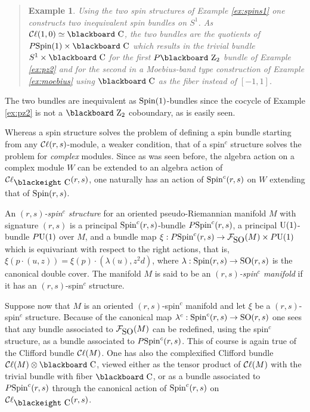 \documentclass[12pt,titlepage]{article}
\def\bbf#1{\hbox{\blackboard #1}}
\def\bbfeight#1{\hbox{\blackeight #1}}
\def\lC{\bbf C}
\def\lCe{\bbfeight C}
\def\lZ{\bbf Z}
\def\cC{{\cal C}}
\def\cF{{\cal F}}
\def\Cl{{\cC\ell}}
\def\SO{\hbox{SO}}
\def\Spin{\hbox{Spin}}
\def\U{\hbox{U}}
\newtheorem{eg}{Example}
\newenvironment{example}{\begin{quote}\begin{eg}}{\end{eg}\end{quote}}
\begin{document}
\begin{example}Using the two spin structures of Example \ref{ex:spins1}
one constructs two inequivalent spin bundles on \(S^1\). As
\(\Cl(1,0)\simeq \lC\), the two bundles are the quotients of
\(P\Spin(1)\times \lC\) which results in the trivial bundle \(S^1\times
\lC\) for the first \(P\lZ_2\) bundle of Example \ref{ex:pz2} and 
for the second in a
Moebius-band type construction of Example \ref{ex:moebius} using \(\lC\)
as the fiber instead of \([-1,1]\). 
\end{example}%
The two bundles are inequivalent as \(\Spin(1)\)-bundles 
since the cocycle 
of Example \ref{ex:pz2} is not a \(\lZ_2\) coboundary, as is easily seen.


Whereas a spin structure solves the problem of defining a spin bundle
starting from any \(\Cl(r,s)\)-module, a weaker condition, that of a
spin\({}^c\) structure solves the problem for {\em complex\/} modules. 
Since as was seen before, 
the algebra action on a complex module \(W\) can
be extended to an algebra action of \(\Cl_{\lCe}(r,s)\), one naturally
has an
action of \(\Spin^c(r,s)\) on \(W\) extending that of \(\Spin(r,s)\).


An {\em \((r,s)\)-spin\({}^c\) structure\/} 
%
for an oriented
pseudo-Riemannian manifold \(M\) with signature \((r,s)\) is a
principal \(\Spin^c(r,s)\)-bundle \(P\Spin^c(r,s)\),  a
principal \(\U(1)\)-bundle \(P\U(1)\) over \(M\), and a bundle
map \(\xi:P\Spin^c(r,s)\to \cF_{\SO}(M)\times P\U(1)\)
which is equivariant with respect to
the right actions, that is,
\(\xi(p\cdot(u, z))=\xi(p)\cdot (\lambda(u), z^2d)\),
where \(\lambda:\Spin(r,s)\to \SO(r,s)\) is the canonical double cover. 
The manifold \(M\) is
said to be an {\em \((r,s)\)-spin\({}^c\) manifold\/} 
%
if it has an
\((r,s)\)-spin\({}^c\) structure. 

Suppose now that \(M\) is an oriented \((r,s)\)-spin\({}^c\) manifold
and let \(\xi\) be a \((r,s)\)-spin\({}^c\) structure.
Because of the canonical map \(\lambda^c:\Spin^c(r,s)\to \SO(r,s)\) one
sees that any bundle associated to
 \(\cF_{\SO}(M)\) can
be redefined,
using the spin\({}^c\) structure, as a bundle associated to
\(P\Spin^c(r,s)\).
This of course is again true of
the Clifford bundle \(\Cl(M)\). One has also the complexified Clifford
bundle  \(\Cl(M)\otimes \lC\), viewed either as the tensor
product of \(\Cl(M)\) with the trivial bundle with fiber \(\lC\), or as
a bundle associated to \(P\Spin^c(r,s)\) through the canonical action of
\(\Spin^c(r,s)\) on \(\Cl_{\lCe}(r,s)\).
\end{document}
